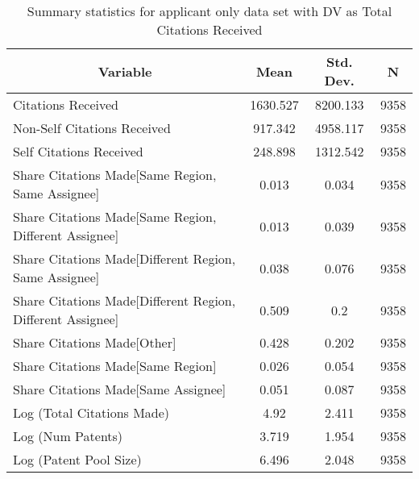 
\begin{table}[htbp]\centering \caption{Summary statistics for applicant only data set with DV as Total Citations Received \label{a.tsummary}}
\scriptsize
\singlespacing
\begin{tabular}{l c c  c}\hline\hline
\multicolumn{1}{c}{\textbf{Variable}} & \textbf{Mean}
 & \textbf{Std. Dev.} & \textbf{N}\\ \hline
Citations Received & 1630.527 & 8200.133  & 9358\\
Non-Self Citations Received & 917.342 & 4958.117  & 9358\\
Self Citations Received & 248.898 & 1312.542  & 9358\\
Share Citations Made[Same Region, Same Assignee] & 0.013 & 0.034  & 9358\\
Share Citations Made[Same Region, Different Assignee] & 0.013 & 0.039  & 9358\\
Share Citations Made[Different Region, Same Assignee] & 0.038 & 0.076  & 9358\\
Share Citations Made[Different Region, Different Assignee] & 0.509 & 0.2  & 9358\\
Share Citations Made[Other] & 0.428 & 0.202  & 9358\\
Share Citations Made[Same Region] & 0.026 & 0.054  & 9358\\
Share Citations Made[Same Assignee] & 0.051 & 0.087  & 9358\\
Log (Total Citations Made) & 4.92 & 2.411  & 9358\\
Log (Num Patents) & 3.719 & 1.954  & 9358\\
Log (Patent Pool Size) & 6.496 & 2.048  & 9358\\
\hline\end{tabular}
\end{table}
